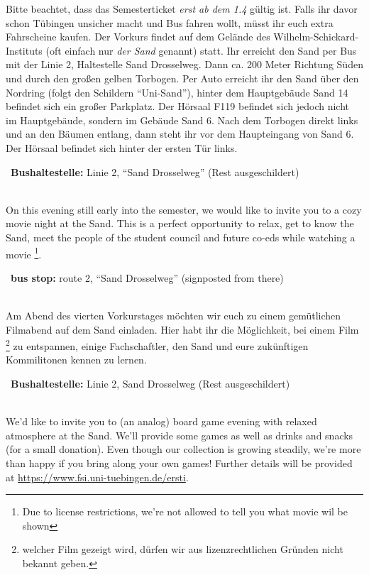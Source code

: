 \begin{description}
	\ifsommersemester
	Bitte beachtet, dass das Semesterticket \emph{erst ab dem 1.4} gültig ist. Falls ihr davor schon Tübingen unsicher macht und Bus fahren wollt, müsst ihr euch extra Fahrscheine kaufen.
	\fi
	Der Vorkurs findet auf dem Gelände des Wilhelm-Schickard-Instituts (oft einfach nur \emph{der Sand} genannt) statt. Ihr erreicht den Sand per Bus mit der Linie 2, Haltestelle Sand Drosselweg. Dann ca. 200 Meter Richtung Süden und durch den großen gelben Torbogen. Per Auto erreicht ihr den Sand über den Nordring (folgt den Schildern "`Uni-Sand"'), hinter dem Hauptgebäude Sand 14 befindet sich ein großer Parkplatz. Der Hörsaal F119 befindet sich jedoch nicht im Hauptgebäude, sondern im Gebäude Sand 6. Nach dem Torbogen direkt links und an den Bäumen entlang, dann steht ihr vor dem Haupteingang von Sand 6. Der Hörsaal befindet sich hinter der ersten Tür links.

	~\textbf{Bushaltestelle:} Linie 2, "`Sand Drosselweg"' (Rest ausgeschildert)
\fi 

\ifml 
	\item[Tuesday, October 2nd, \YEAR, 19:00, Sand 14, room A104 (meeting point is signposted)]\ \\
	On this evening still early into the semester, we would like to invite you to a cozy movie night at the Sand. This is a perfect opportunity to relax, get to know the Sand, meet the people of the student council and future co-eds while watching a movie \footnote{Due to license restrictions, we're not allowed to tell you what movie wil be shown}. 
	
	~\textbf{bus stop:} route 2, "`Sand Drosselweg"' (signposted from there)
\else 
	\item[Dienstag, 2. Oktober \YEAR, 19:00 Uhr, Sand 14, Raum A301 (Treffpunkt ausgeschildert)]\ \\
	Am Abend des vierten Vorkurstages möchten wir euch zu einem gemütlichen Filmabend auf dem Sand einladen.
	Hier habt ihr die Möglichkeit, bei einem Film \footnote{welcher Film gezeigt wird, dürfen wir aus lizenzrechtlichen Gründen nicht bekannt geben.} zu entspannen, einige Fachschaftler, den Sand und eure zukünftigen Kommilitonen kennen zu lernen.

	~\textbf{Bushaltestelle:} Linie 2, Sand Drosselweg (Rest ausgeschildert)
\fi 


\ifml
	\item[Friday, October 4th, \YEAR, 19:00, Sand]\ \\
	We'd like to invite you to (an analog) board game evening with relaxed atmosphere at the Sand. We'll provide some games as well as drinks and snacks (for a small donation). Even though our collection is growing steadily, we're more than happy if you bring along your own games! Further details will be provided at \url{https://www.fsi.uni-tuebingen.de/ersti}.
	

\end{description}
